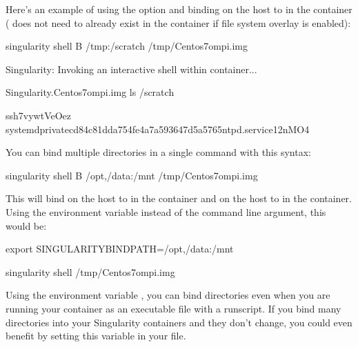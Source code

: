 \documentclass[letterpaper,10pt,english]{sphinxmanual}
\begin{document}
Here’s an example of using the  option and binding  on the host to  in
the container ( does not need to already exist in the container if
file system overlay is enabled):

%
\begin{sphinxVerbatim}[commandchars=\\\{\}]
\PYGZdl{} singularity shell \PYGZhy{}B /tmp:/scratch /tmp/Centos7\PYGZhy{}ompi.img

Singularity: Invoking an interactive shell within container...


Singularity.Centos7\PYGZhy{}ompi.img\PYGZgt{} ls /scratch

ssh\PYGZhy{}7vywtVeOez  systemd\PYGZhy{}private\PYGZhy{}cd84c81dda754fe4a7a593647d5a5765\PYGZhy{}ntpd.service\PYGZhy{}12nMO4
\end{sphinxVerbatim}

You can bind multiple directories in a single command with this
syntax:

%
\begin{sphinxVerbatim}[commandchars=\\\{\}]
\PYGZdl{} singularity shell \PYGZhy{}B /opt,/data:/mnt /tmp/Centos7\PYGZhy{}ompi.img
\end{sphinxVerbatim}

This will bind  on the host to  in the container and  on the host to  in the
container. Using the environment variable instead of the command line
argument, this would be:

%
\begin{sphinxVerbatim}[commandchars=\\\{\}]
\PYGZdl{} export SINGULARITY\PYGZus{}BINDPATH=\PYGZdq{}/opt,/data:/mnt\PYGZdq{}

\PYGZdl{} singularity shell /tmp/Centos7\PYGZhy{}ompi.img
\end{sphinxVerbatim}

Using the environment variable , you can bind directories even when you
are running your container as an executable file with a runscript. If
you bind many directories into your Singularity containers and they
don’t change, you could even benefit by setting this variable in your 
file.
\end{document}
